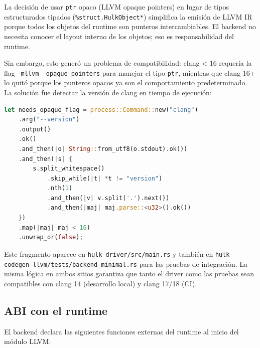 \documentclass[12pt,letterpaper]{article}
\newcommand{\src}[1]{\texttt{#1}}
\begin{document}
La decisión de usar \src{ptr} opaco (LLVM opaque pointers) en lugar de tipos estructurados tipados (\src{\%struct.HulkObject*}) simplifica la emisión de LLVM IR porque todos los objetos del runtime son punteros intercambiables. El backend no necesita conocer el layout interno de los objetos; eso es responsabilidad del runtime.

Sin embargo, esto generó un problema de compatibilidad: clang < 16 requería la flag \src{-mllvm -opaque-pointers} para manejar el tipo \src{ptr}, mientras que clang 16+ lo quitó porque los punteros opacos ya son el comportamiento predeterminado. La solución fue detectar la versión de clang en tiempo de ejecución:

\begin{lstlisting}[language=Rust,caption={Detección dinámica de versión de clang}]
let needs_opaque_flag = process::Command::new("clang")
    .arg("--version")
    .output()
    .ok()
    .and_then(|o| String::from_utf8(o.stdout).ok())
    .and_then(|s| {
        s.split_whitespace()
            .skip_while(|t| *t != "version")
            .nth(1)
            .and_then(|v| v.split('.').next())
            .and_then(|maj| maj.parse::<u32>().ok())
    })
    .map(|maj| maj < 16)
    .unwrap_or(false);
\end{lstlisting}

Este fragmento aparece en \src{hulk-driver/src/main.rs} y también en \src{hulk-codegen-llvm/tests/backend\_minimal.rs} para las pruebas de integración. La misma lógica en ambos sitios garantiza que tanto el driver como las pruebas sean compatibles con clang 14 (desarrollo local) y clang 17/18 (CI).

\subsection{ABI con el runtime}

El backend declara las siguientes funciones externas del runtime al inicio del módulo LLVM:
\end{document}
